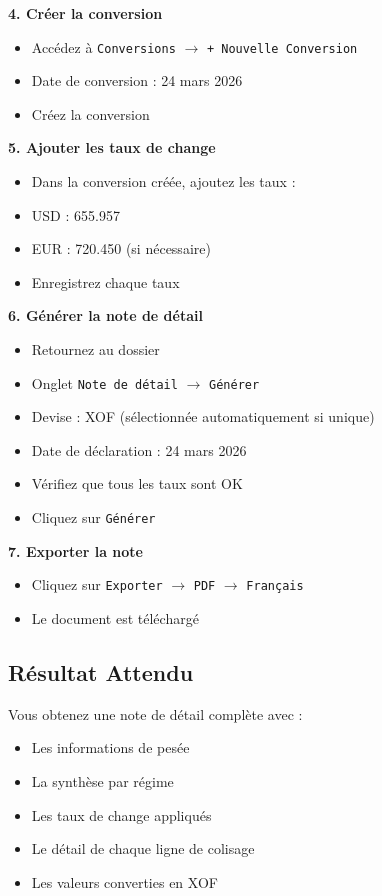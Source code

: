 \documentclass[12pt,a4paper]{report}
\begin{document}
\textbf{4. Créer la conversion}

\begin{itemize}[leftmargin=*]
    \item Accédez à \texttt{Conversions} $\rightarrow$ \texttt{+ Nouvelle Conversion}
    \item Date de conversion : 24 mars 2026
    \item Créez la conversion
\end{itemize}

\textbf{5. Ajouter les taux de change}

\begin{itemize}[leftmargin=*]
    \item Dans la conversion créée, ajoutez les taux :
    \item USD : 655.957
    \item EUR : 720.450 (si nécessaire)
    \item Enregistrez chaque taux
\end{itemize}

\textbf{6. Générer la note de détail}

\begin{itemize}[leftmargin=*]
    \item Retournez au dossier
    \item Onglet \texttt{Note de détail} $\rightarrow$ \texttt{Générer}
    \item Devise : XOF (sélectionnée automatiquement si unique)
    \item Date de déclaration : 24 mars 2026
    \item Vérifiez que tous les taux sont OK
    \item Cliquez sur \texttt{Générer}
\end{itemize}

\textbf{7. Exporter la note}

\begin{itemize}[leftmargin=*]
    \item Cliquez sur \texttt{Exporter} $\rightarrow$ \texttt{PDF} $\rightarrow$ \texttt{Français}
    \item Le document est téléchargé
\end{itemize}

\subsection{Résultat Attendu}

Vous obtenez une note de détail complète avec :
\begin{itemize}[leftmargin=*]
    \item Les informations de pesée
    \item La synthèse par régime
    \item Les taux de change appliqués
    \item Le détail de chaque ligne de colisage
    \item Les valeurs converties en XOF
\end{itemize}
\end{document}
